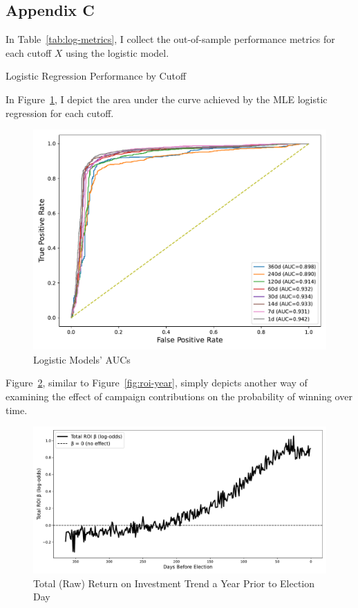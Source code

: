\subsection*{Appendix C}

In Table~\ref{tab:log-metrics}, I collect the out-of-sample performance metrics for each cutoff $X$ using the logistic model.

\begin{table}[H]
	\centering
	
	\caption{Logistic Regression Performance by Cutoff}
	\label{tab:log-metrics}
\end{table}

In Figure~\ref{fig:log-roc}, I depict the area under the curve achieved by the MLE logistic regression for each cutoff.

\begin{figure}[H]
	\centering
	\includegraphics[width = 0.8\linewidth]{../Figures/log_roc.pdf}
	\caption{Logistic Models' AUCs}
	\label{fig:log-roc}
\end{figure}

Figure~\ref{fig:roi-beta}, similar to Figure~\ref{fig:roi-year}, simply depicts another way of examining the effect of campaign contributions on the probability of winning over time. 

\begin{figure}[H]
	\centering
	\includegraphics[width = 0.8\linewidth]{../Figures/roi_beta_over_time.pdf}
	\caption{Total (Raw) Return on Investment Trend a Year Prior to Election Day}
	\label{fig:roi-beta}
\end{figure}

